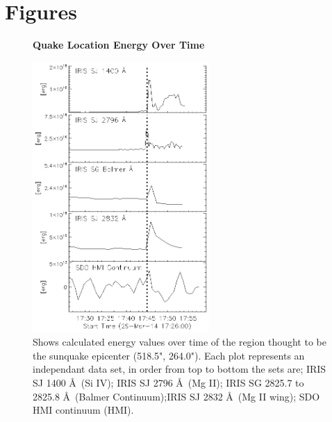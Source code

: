 \section{Figures}\label{figures}
\begin{figure}[H]
  \begin{center}
  \textbf{Quake Location Energy Over Time}\par\medskip
  \includegraphics[width=0.6\textwidth]{29-Mar-14-Quake-Energy-Ladder}
  \end{center}
  \caption{Shows calculated energy values over time of the region thought to be the sunquake epicenter (518.5", 264.0"). Each plot represents an independant data set, in order from top to bottom the sets are; IRIS SJ 1400 \AA\ (Si IV); IRIS SJ 2796 \AA\ (Mg II); IRIS SG  2825.7 to 2825.8 \AA\ (Balmer Continuum);IRIS SJ 2832 \AA\ (Mg II wing); SDO HMI continuum (HMI).}\label{eqk}
\end{figure}

